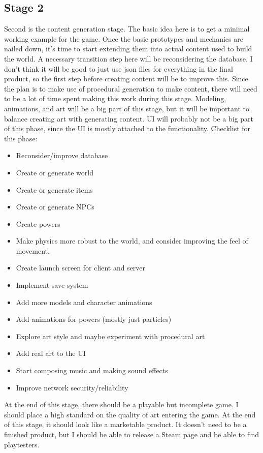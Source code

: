 \documentclass{article}
\begin{document}
\subsection{Stage 2}
Second is the content generation stage. The basic idea here is to get a minimal working
example for the game. Once the basic prototypes and mechanics are nailed down,
it's time to start extending them into actual content used to build the world.
A necessary transition step here will be reconsidering the database. I don't think
it will be good to just use json files for everything in the final product, so the first
step before creating content will be to improve this. Since the plan is to make use of procedural
generation to make content, there will need to be a lot of time spent making this work during
this stage. Modeling, animations, and art will be a big part of this stage, but it will be
important to balance creating art with generating content. UI will probably not be a big
part of this phase, since the UI is mostly attached to the functionality.
Checklist for this phase:
\begin{itemize}
    \item Reconsider/improve database
    \item Create or generate world
    \item Create or generate items
    \item Create or generate NPCs
    \item Create powers
    \item Make physics more robust to the world, and consider improving the feel of movement.
    \item Create launch screen for client and server
    \item Implement save system
    \item Add more models and character animations
    \item Add animations for powers (mostly just particles)
    \item Explore art style and maybe experiment with procedural art
    \item Add real art to the UI
    \item Start composing music and making sound effects
    \item Improve network security/reliability
\end{itemize}
At the end of this stage, there should be a playable but incomplete game.
I should place a high standard on the quality of art entering the game. At the end of this stage,
it should look like a marketable product. It doesn't need to be a finished product, but I should
be able to release a Steam page and be able to find playtesters.
\end{document}
